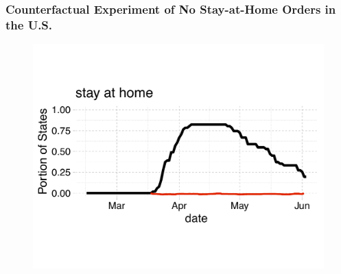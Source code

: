\documentclass{beamer}
\begin{document}
\begin{frame}
  \frametitle{Counterfactual Experiment of No Stay-at-Home Orders in the U.S.}

\vspace{-0.5cm}
\begin{figure}[ht]%
  \begin{minipage}{\linewidth} 
      \includegraphics[width=\textwidth]{pshelter_p_experiment} 
  \end{minipage}
\end{figure}


\end{frame}



\end{document}
